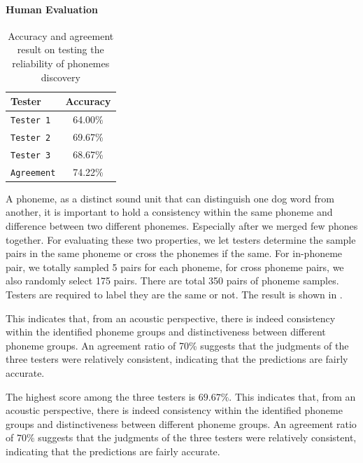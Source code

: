 \paragraph{Human Evaluation}

\begin{table}[th]
\centering
\small
\begin{tabular}{lc}
\hline
\textbf{Tester} & \textbf{Accuracy}\\
\hline
\verb|Tester 1| & 64.00\%  \\
\verb|Tester 2| & 69.67\%  \\
\verb|Tester 3| & 68.67\% \\
\verb|Agreement| & 74.22\%  \\\hline
\end{tabular}
\caption{Accuracy and agreement result on testing the reliability of phonemes discovery}

\label{tab:phonetestresult}
\end{table}

A phoneme, as a distinct sound unit that can distinguish one dog word from another, it is important to hold a consistency within the same phoneme and difference between two different phonemes. Especially after we merged few phones together. For evaluating these two properties, we let testers determine the sample pairs in the same phoneme or cross the phonemes if the same. For in-phoneme pair, we totally sampled 5 pairs for each phoneme, for cross phoneme pairs, we also randomly select 175 pairs. There are total 350 pairs of phoneme samples. Testers are required to label they are the same or not. The result is shown in .

This indicates that, from an acoustic perspective, there is indeed consistency within the identified phoneme groups and distinctiveness between different phoneme groups. An agreement ratio of 70\% suggests that the judgments of the three testers were relatively consistent, indicating that the predictions are fairly accurate.

The highest score among the three testers is $69.67\%$. This indicates that, from an acoustic perspective, there is indeed consistency within the identified phoneme groups and distinctiveness between different phoneme groups. An agreement ratio of $70\%$ suggests that the judgments of the three testers were relatively consistent, indicating that the predictions are fairly accurate.


